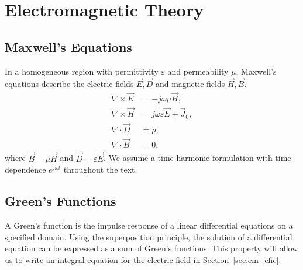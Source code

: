 \section{Electromagnetic Theory}

\subsection{Maxwell's Equations}
In a homogeneous region with permittivity $\varepsilon$ and permeability $\mu$, Maxwell's equations describe the electric fields $\vec{E}, \vec{D}$ and magnetic fields $\vec{H}, \vec{B}$.
\begin{align}
	\nabla \times \vec{E} & = -j\omega\mu\vec{H}, \label{eq:maxwell_E} \\
	\nabla \times \vec{H} & = j\omega\varepsilon\vec{E} + \vec{J}_0, \label{eq:maxwell_H} \\
	\nabla \cdot \vec{D} & = \rho, \label{eq:maxwell_D} \\
	\nabla \cdot \vec{B} & = 0, \label{eq:maxwell_B}
\end{align}
where $\vec{B} = \mu \vec{H}$ and $\vec{D} = \varepsilon \vec{E}$. We assume a time-harmonic formulation with time dependence $e^{j\omega t}$ throughout the text.

\subsection{Green's Functions}
A Green's function is the impulse response of a linear differential equations on a specified domain. Using the superposition principle, the solution of a differential equation can be expressed as a sum of Green's functions. This property will allow us to write an integral equation for the electric field in Section~\ref{sec:em_efie}.

